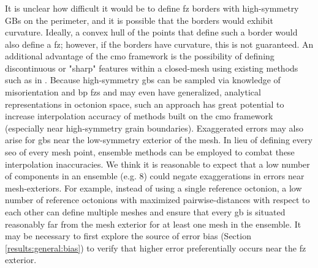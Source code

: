 \documentclass[preprint,12pt]{elsarticle}
\begin{document}
\subsubsection{}
It is unclear how difficult it would be to define \gls{fz} borders with high-symmetry GBs on the perimeter, and it is possible that the borders would exhibit curvature. Ideally, a convex hull of the points that define such a border would also define a \gls{fz}; however, if the borders have curvature, this is not guaranteed. An additional advantage of the \gls{cmo} framework is the possibility of defining discontinuous or "sharp" features within a closed-mesh using existing methods such as in \cite{tianNonUniformSubdivisionSurfaces2020}. Because high-symmetry \glspl{gb} can be sampled via knowledge of misorientation and \gls{bp} \glspl{fz} and may even have generalized, analytical representations in octonion space, such an approach has great potential to increase interpolation accuracy of methods built on the \gls{cmo} framework (especially near high-symmetry grain boundaries). Exaggerated errors may also arise for \glspl{gb} near the low-symmetry exterior of the mesh. In lieu of defining every \gls{seo} of every mesh point, ensemble methods can be employed to combat these interpolation inaccuracies. We think it is reasonable to expect that a low number of components in an ensemble (e.g. 8) could negate exaggerations in errors near mesh-exteriors. For example, instead of using a single reference octonion, a low number of reference octonions with maximized pairwise-distances \cite{dolanBenchmarkingOptimizationSoftware2004,ConstrainedElectrostaticNonlinear2020} with respect to each other can define multiple meshes and ensure that every \gls{gb} is situated reasonably far from the mesh exterior for at least one mesh in the ensemble. It may be necessary to first explore the source of error bias (Section \cref{results:general:bias}) to verify that higher error preferentially occurs near the \gls{fz} exterior.
\end{document}
